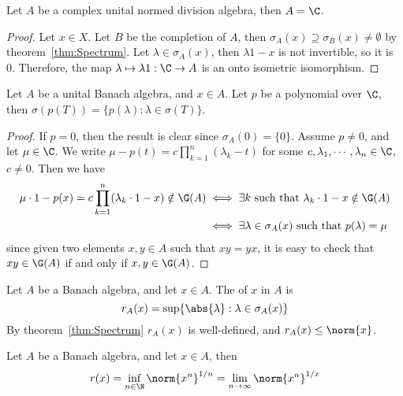 \documentclass[a4paper]{article}
\begin{document}
\begin{ncor}\label{cor:GelfandMazur}
  Let $A$ be a complex unital normed division algebra, then $A=\C$.
\end{ncor}

\begin{proof}
  Let $x\in X$. Let $B$ be the completion of $A$, then $\sigma_A(x)\supseteq\sigma_B(x)\not=\emptyset$ by theorem~\ref{thm:Spectrum}. Let $\lambda\in\sigma_A(x)$, then $\lambda 1-x$ is not invertible, so it is 0. Therefore, the map $\lambda\mapsto\lambda 1:\C\to A$ is an onto isometric isomorphism.
\end{proof}

\begin{nprop}\label{prop:PolynomialSpectralMapping}
  Let $A$ be a unital Banach algebra, and $x\in A$. Let $p$ be a polynomial over $\C$, then $\sigma(p(T))=\{p(\lambda): \lambda\in\sigma(T)\}$.
\end{nprop}

\begin{proof}
  If $p=0$, then the result is clear since $\sigma_A(0)=\{0\}$. Assume $p\not= 0$, and let $\mu\in\C$. We write $\mu-p(t)=c\prod_{k=1}^n(\lambda_k-t)$ for some $c,\lambda_1,\cdots,\lambda_n\in\C$, $c\not= 0$. Then we have
	\begin{align*}
		\mu\cdot 1-p(x)=c\prod_{k=1}^n(\lambda_k\cdot 1-x)\notin\G(A)&\iff\exists k\text{ such that }\lambda_k\cdot 1-x\notin\G(A)\\
		&\iff \exists \lambda\in\sigma_A(x) \text{ such that }p(\lambda)=\mu
	\end{align*}
  since given two elements $x,y\in A$ such that $xy=yx$, it is easy to check that $xy\in\G(A)$ if and only if $x,y\in\G(A)$.
\end{proof}

Let $A$ be a Banach algebra, and let $x\in A$. The  of $x$ in $A$ is
\[
  r_A(x)=\sup\{\abs{\lambda}:\lambda\in\sigma_A(x)\}
\]
By theorem~\ref{thm:Spectrum} $r_A(x)$ is well-defined, and $r_A(x)\leq\norm{x}$.

\begin{nthm}\label{thm:GelfandSpectralRaidus}
Let $A$ be a Banach algebra, and let $x\in A$, then
\[r(x)=\inf_{n\in\N}\norm{x^n}^{1/n}=\lim_{n\to\infty}\norm{x^n}^{1/x}\]
\end{nthm}
\end{document}
